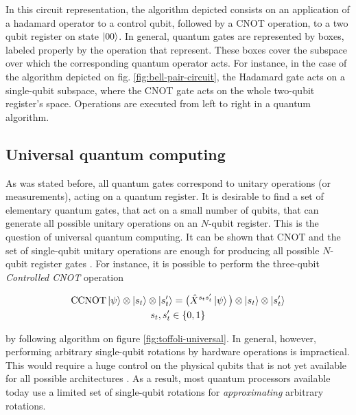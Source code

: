     

    In this circuit representation, the algorithm depicted consists on an application of a hadamard operator to a control qubit, followed by a CNOT operation, to a two qubit register on state $\ket{00}$. In general, quantum gates are represented by boxes, labeled properly by the operation that represent. These boxes cover the subspace over which the corresponding quantum operator acts. For instance, in the case of the algorithm depicted on fig. \ref{fig:bell-pair-circuit}, the Hadamard gate acts on a single-qubit subspace, where the CNOT gate acts on the whole two-qubit register's space. Operations are executed from left to right in a quantum algorithm.

  \subsection{Universal quantum computing}
    
    As was stated before, all quantum gates correspond to unitary operations (or measurements), acting on a quantum register. It is desirable to find a set of elementary quantum gates, that act on a small number of qubits, that can generate all possible unitary operations on an $N$-qubit register. This is the question of universal quantum computing. It can be shown that CNOT and the set of single-qubit unitary operations are enough for producing all possible $N$-qubit register gates \cite{Nielsen}. For instance, it is possible to perform the three-qubit \textit{Controlled CNOT} operation

    \begin{gather}
      \text{CCNOT} \ket{\psi} \otimes \ket{s_t} \otimes \ket{s'_t} = \big(\hat{X}^{s_t s'_t} \ket{\psi}\big) \otimes \ket{s_t} \otimes \ket{s'_t} \\
      s_t, s'_t \in \{0,1\}
      \label{eq:toffoli-definition}
    \end{gather}

    by following algorithm on figure \ref{fig:toffoli-universal}. In general, however, performing arbitrary single-qubit rotations by hardware operations is impractical. This would require a huge control on the physical qubits that is not yet available for all possible architectures \cite{Nielsen}. As a result, most quantum processors available today use a limited set of single-qubit rotations for \textit{approximating} arbitrary rotations.

    

